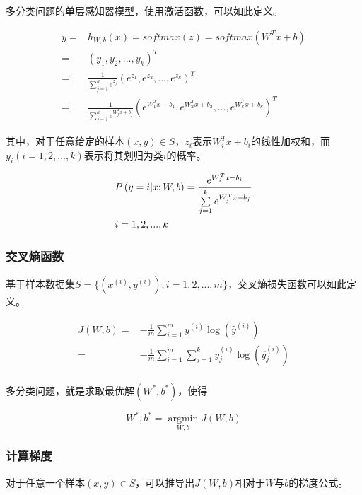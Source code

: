 \begin{content}
多分类问题的单层感知器模型，使用激活函数，可以如此定义。

\[\begin{aligned}
  y =  & {h_{W,b}}(x) = softmax (z) = softmax ({W^T}x + b) \\ 
   =  & {\left( {{y_1},{y_2},...,{y_k}} \right)^T} \\ 
   =  & \frac{1}{{\sum\limits_{j = 1}^k {{e^{{z_j}}}} }}{\left( {{e^{{z_1}}},{e^{{z_2}}},...,{e^{{z_k}}}} \right)^T} \\ 
   =  & \frac{1}{{\sum\limits_{j = 1}^k {{e^{W_j^Tx + {b_j}}}} }}{\left( {{e^{W_1^Tx + {b_1}}},{e^{W_2^Tx + {b_2}}},...,{e^{W_k^Tx + {b_k}}}} \right)^T} \ 
\end{aligned} \]

其中，对于任意给定的样本$ (x, y) \in S $，$ z_i $表示$W_i^Tx+b_i$的线性加权和，而$y_i(i=1,2,...,k)$表示将其划归为类$i$的概率。

\[\begin{gathered}
  P\left( {y = i|x;W,b} \right) = \frac{{{e^{W_i^Tx + b_i}}}}{{\sum\limits_{j = 1}^k {{e^{W_j^Tx + b_j}}} }} \hfill \\
  i = 1,2,...,k \hfill \\ 
\end{gathered} \]


\subsubsection{交叉熵函数}

基于样本数据集$ S = \{ ({x^{(i)}},{y^{(i)}});i = 1,2,...,m\} $，交叉熵损失函数可以如此定义。

\[\begin{aligned}
  J(W,b) =  &  - \frac{1}{m}\sum\limits_{i = 1}^m {{y^{(i)}}\log \left( {{{\widehat y}^{(i)}}} \right)}  \\ 
   =  &  - \frac{1}{m}\sum\limits_{i = 1}^m {\sum\limits_{j = 1}^k {y_j^{(i)}\log \left( {\widehat y_j^{(i)}} \right)} }  \\
\end{aligned} \]

多分类问题，就是求取最优解$(W^*,b^*)$，使得

\[W^*,b^* = \mathop {\arg \min }\limits_{W,b} J(W,b)\]

\subsubsection{计算梯度}

对于任意一个样本$ (x,y) \in S $，可以推导出$ J(W,b) $相对于$ W $与$ b $的梯度公式。


\end{content}
